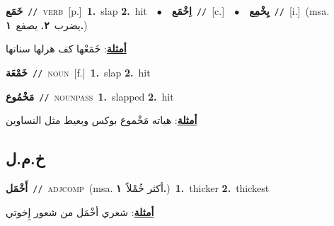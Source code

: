\documentclass[10pt,a4paper,twoside]{article} %
\begin{document}
\begin{multicols}{2}
{\setlength\topsep{0pt}\textbf{\foreignlanguage{arabic}{خَمَع}}\ {\color{gray}\texttt{//}\color{black}}\ \textsc{verb}\ [p.]\ \textbf{1.}~slap  \textbf{2.}~hit\ \ $\bullet$\ \ \setlength\topsep{0pt}\textbf{\foreignlanguage{arabic}{اِخْمَع}}\ {\color{gray}\texttt{//}\color{black}}\ [c.]\ \ $\bullet$\ \ \setlength\topsep{0pt}\textbf{\foreignlanguage{arabic}{يِخْمِع}}\ {\color{gray}\texttt{//}\color{black}}\ [i.]\ \color{gray}(msa. \foreignlanguage{arabic}{يضرب}~\foreignlanguage{arabic}{\textbf{٢.}}  \foreignlanguage{arabic}{يصفع}~\foreignlanguage{arabic}{\textbf{١.}})\color{black}\  \begin{flushright}\color{gray}\foreignlanguage{arabic}{\textbf{\underline{\foreignlanguage{arabic}{أمثلة}}}: خَمَعْها كف هرلها سنانها}\end{flushright}\color{black}} \vspace{2mm}

{\setlength\topsep{0pt}\textbf{\foreignlanguage{arabic}{خَمْعَة}}\ {\color{gray}\texttt{//}\color{black}}\ \textsc{noun}\ [f.]\ \textbf{1.}~slap  \textbf{2.}~hit\ } \vspace{2mm}

{\setlength\topsep{0pt}\textbf{\foreignlanguage{arabic}{مَخْمُوع}}\ {\color{gray}\texttt{//}\color{black}}\ \textsc{noun\textunderscore pass}\ \textbf{1.}~slapped  \textbf{2.}~hit\  \begin{flushright}\color{gray}\foreignlanguage{arabic}{\textbf{\underline{\foreignlanguage{arabic}{أمثلة}}}: هياته مَخْموع بوكس وبعيط مثل النساوين}\end{flushright}\color{black}} \vspace{2mm}

\vspace{-3mm}
\subsection*{\color{blue}\foreignlanguage{arabic}{خ.م.ل}\color{blue}{}} 

{\setlength\topsep{0pt}\textbf{\foreignlanguage{arabic}{أَخْمَل}}\ {\color{gray}\texttt{//}\color{black}}\ \textsc{adj\textunderscore comp}\ \color{gray}(msa. \foreignlanguage{arabic}{أكثر خُمْلاً}~\foreignlanguage{arabic}{\textbf{١.}})\color{black}\ \textbf{1.}~thicker  \textbf{2.}~thickest\  \begin{flushright}\color{gray}\foreignlanguage{arabic}{\textbf{\underline{\foreignlanguage{arabic}{أمثلة}}}: شعري أخْمَل من شعور إِخوتي}\end{flushright}\color{black}} \vspace{2mm}


\end{multicols}
\end{document}
